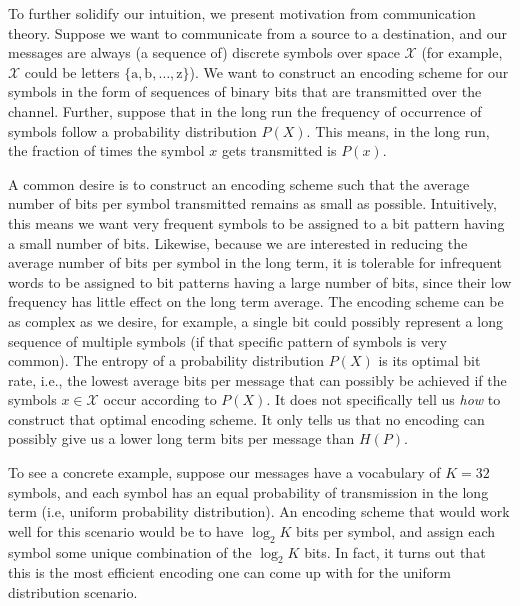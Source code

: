 To further solidify our intuition, we present motivation from communication theory. Suppose we want to communicate from a source to a destination, and our messages are always (a sequence of) discrete symbols over space $\mathcal{X}$ (for example, $\mathcal{X}$ could be letters $\{ \text{a}, \text{b}, \dots, \text{z} \}$).
We want to construct an encoding scheme for our symbols in the form of sequences of binary bits
that are transmitted over the channel. Further, suppose that in the long run the
frequency of occurrence of symbols follow a probability distribution $P(X)$. This
means, in the long run, the fraction of times the symbol $x$ gets transmitted is $P(x)$.

A common desire is to construct an encoding scheme such that the average number of bits
per symbol transmitted remains as small as possible. Intuitively, this means we want very frequent
symbols to be assigned to a bit pattern having a small number of bits. Likewise, because we
are interested in reducing the average number of bits per symbol in the long term,
it is tolerable for infrequent words to be assigned to bit patterns having a
large number of bits, since their low frequency has little
effect on the long term average. The encoding scheme can be as complex as we desire, for example,
a single bit could possibly represent a long sequence of multiple symbols (if
that specific pattern of symbols is very common). The entropy of a probability distribution
$P(X)$ is its optimal bit rate, i.e., the lowest average bits per message that can possibly be achieved if
the symbols $x \in \mathcal{X}$ occur according to $P(X)$. It
does not specifically tell us \emph{how} to construct that optimal encoding scheme. It only
tells us that no encoding can possibly give us a lower long term bits per message
than $H(P)$.

To see a concrete example, suppose our messages have a vocabulary of $K=32$ symbols,
and each symbol has an equal probability of transmission in the long term (i.e, uniform
probability distribution). An encoding scheme that
would work well for this scenario would be to have $\log_2 K$ bits per symbol, and assign
each symbol some unique combination of the $\log_2 K$ bits. In fact, it turns out that
this is the most efficient encoding one can come up with for the uniform distribution
scenario.

